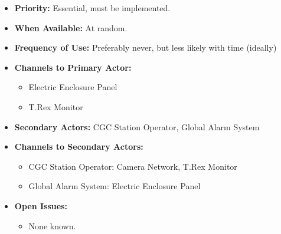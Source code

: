 \documentclass[12pt]{article}
\begin{document}
\begin{itemize}
        \item[]\textbf{Priority:}
            Essential, must be implemented.

        \item[]\textbf{When Available:}
            At random.

        \item[]\textbf{Frequency of Use:}
            Preferably never, but less likely with time (ideally)

        \item[]\textbf{Channels to Primary Actor:}
            \begin{itemize}
                \item[] Electric Enclosure Panel
                \item[] T.Rex Monitor
            \end{itemize}
            
        \item[]\textbf{Secondary Actors:}
            CGC Station Operator, Global Alarm System
            
        \item[]\textbf{Channels to Secondary Actors:}  
            \begin{itemize}
                \item[] CGC Station Operator: Camera Network, T.Rex Monitor
                \item[] Global Alarm System: Electric Enclosure Panel
            \end{itemize}

        \item[]\textbf{Open Issues:}
            \begin{itemize}
                \item[] None known.
            \end{itemize}
    \end{itemize}
    
    
    
    
\end{document}
